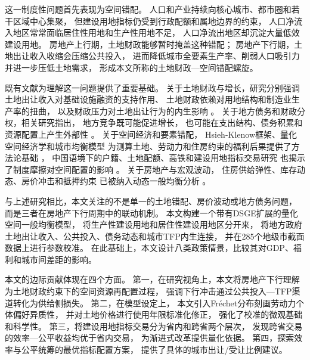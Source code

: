\documentclass[UTF8,a4paper,12pt]{ctexart}
\theoremstyle{plain}
\theoremstyle{definition}
\theoremstyle{remark}
\begin{document}
这一制度性问题首先表现为空间错配。
人口和产业持续向核心城市、都市圈和若干区域中心集聚，
但建设用地指标仍受到行政配额和属地边界的约束，
人口净流入地区常常面临居住性用地和生产性用地不足，
人口净流出地区却沉淀大量低效建设用地。
房地产上行期，土地财政能够暂时掩盖这种错配；
房地产下行期，土地出让收入收缩会压缩公共投入，
进而降低城市全要素生产率、削弱人口吸引力并进一步压低土地需求，
形成本文所称的土地财政—空间错配螺旋。

既有文献为理解这一问题提供了重要基础。
关于土地财政与增长，研究分别强调土地出让收入对基础设施融资的支持作用、
土地财政依赖对用地结构和制造业生产率的扭曲，
以及财政压力对土地出让行为的内生影响
\citep{chen2016,liu2021,zhao2015,fan2019,liu2018}。
关于地方债务和财政分权，相关研究指出，
地方竞争既可能促进增长，
也可能在支出结构、债务积累和资源配置上产生外部性
\citep{bai2016,luo2022,fuyong2007,qiantingyi1994,tiebout1956,oates1972,musgrave1959}。
关于空间经济和要素错配，
Hsieh-Klenow框架、量化空间经济学和城市均衡模型
为测算土地、劳动力和住房约束的福利后果提供了方法论基础
\citep{hsiehklenow2009,eaton2002,ahlfeldt2015,redding2017,fajgelbaum2019,
henderson1974,rosen1979,roback1982,hsiehmoretti2019,diamond2016}，
中国语境下的户籍、土地配额、高铁和建设用地指标交易研究
也揭示了制度摩擦对空间配置的影响
\citep{wang2020,lu2019,yan2021,kline2014,chen2020,lu2020}。
关于房地产与宏观波动，
住房供给弹性、库存动态、房价冲击和抵押约束
已被纳入动态一般均衡分析
\citep{glaeser2005,gyourko2013,favilukis2017,chen2017,huang2018,
kiyotakimoore1997,iacoviello2005,liuetal2013,chen2016b}。

与上述研究相比，本文关注的不是单一的土地错配、房价波动或地方债务问题，
而是三者在房地产下行周期中的联动机制。
本文构建一个带有DSGE扩展的量化空间一般均衡模型，
将生产性建设用地和居住性建设用地区分开来，
将地方政府土地出让收入、公共投入、债务动态和城市TFP内生连接，
并在285个地级市截面数据上进行参数校准。
在此基础上，本文设计八类政策情景，比较其对GDP、福利和城市间差距的影响。

本文的边际贡献体现在四个方面。
第一，在研究视角上，本文将房地产下行理解为土地财政约束下的空间资源再配置过程，
强调下行冲击通过公共投入—TFP渠道转化为供给侧损失。
第二，在模型设定上，
本文引入Fréchet分布刻画劳动力个体偏好异质性，
并对土地价格进行使用年限标准化修正，
强化了校准的微观基础和科学性。
第三，将建设用地指标交易分为省内和跨省两个层次，
发现跨省交易的效率—公平收益均优于省内交易，
为渐进式改革提供量化依据。
第四，探索效率与公平统筹的最优指标配置方案，
提供了具体的城市出让/受让比例建议。

\end{document}
